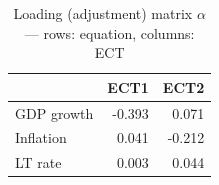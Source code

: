 \begin{table}

\caption{\label{tab:vecm-loadings}Loading (adjustment) matrix $\alpha$ --- rows: equation, columns: ECT}
\centering
\begin{tabular}[t]{lrr}
\toprule
  & ECT1 & ECT2\\
\midrule
GDP growth & -0.393 & 0.071\\
Inflation & 0.041 & -0.212\\
LT rate & 0.003 & 0.044\\
\bottomrule
\end{tabular}
\end{table}
